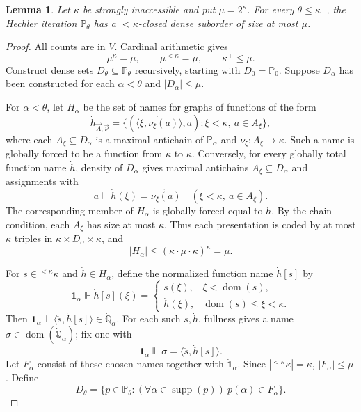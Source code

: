 \documentclass[11pt,a4paper]{amsart}
\newtheorem{lemma}[theorem]{Lemma}
\theoremstyle{definition}
\theoremstyle{remark}
\newcommand{\PP}{\mathbb P}
\DeclareMathOperator{\dom}{dom}
\DeclareMathOperator{\supp}{supp}
\begin{document}
\begin{lemma}\label{lem:iteration-size}
Let \(\kappa\) be strongly inaccessible and put \(\mu=2^\kappa\).
For every \(\theta\leq\kappa^+\), the Hechler iteration
\(\PP_\theta\) has a \(<\kappa\)-closed dense suborder of
size at most \(\mu\).
\end{lemma}
\begin{proof}
All counts are in \(V\). Cardinal arithmetic gives
\[
 \mu^\kappa=\mu,\qquad \mu^{<\kappa}=\mu,
 \qquad\kappa^+\leq\mu.
\]
Construct dense sets \(D_\theta\subseteq\PP_\theta\)
recursively, starting with \(D_0=\PP_0\). Suppose
\(D_\alpha\) has been constructed for each \(\alpha<\theta\)
and \(|D_\alpha|\leq\mu\).

For \(\alpha<\theta\), let \(H_\alpha\) be the set of
names for graphs of functions of the form
\[
 \dot h_{\vec A,\vec\nu}=
 \{(\check{\langle\xi,\nu_\xi(a)\rangle},a):
                       \xi<\kappa,\ a\in A_\xi\},
\]
where each \(A_\xi\subseteq D_\alpha\) is a maximal
antichain of \(\PP_\alpha\) and
\(\nu_\xi:A_\xi\to\kappa\). Such a name is globally
forced to be a function from \(\kappa\) to \(\kappa\).
Conversely, for every globally total function name
\(\dot h\), density of \(D_\alpha\) gives maximal
antichains \(A_\xi\subseteq D_\alpha\) and assignments with
\[
 a\Vdash\dot h(\xi)=\check{\nu_\xi(a)}
                            \quad(\xi<\kappa,\ a\in A_\xi).
\]
The corresponding member of \(H_\alpha\) is globally
forced equal to \(\dot h\). By the chain condition,
each \(A_\xi\) has size at most \(\kappa\). Thus each
presentation is coded by at most \(\kappa\) triples in
\(\kappa\times D_\alpha\times\kappa\), and
\[
 |H_\alpha|\leq
            (\kappa\cdot\mu\cdot\kappa)^\kappa=\mu.
\]

For \(s\in{}^{<\kappa}\kappa\) and \(\dot h\in H_\alpha\),
define the normalized function name \(\dot h[s]\) by
\[
 \mathbf1_\alpha\Vdash\dot h[s](\xi)=
 \begin{cases}
  s(\xi),&\xi<\dom(s),\\
  \dot h(\xi),&\dom(s)\leq\xi<\kappa.
 \end{cases}
\]
Then \(\mathbf1_\alpha\Vdash
\langle\check s,\dot h[s]\rangle
                                      \in\dot{\mathbb Q}_\alpha\).
For each such \(s,\dot h\), fullness gives a name
\(\sigma\in\dom(\dot{\mathbb Q}_\alpha)\); fix one with
\[
 \mathbf1_\alpha\Vdash
                 \sigma=\langle\check s,\dot h[s]\rangle.
\]
Let \(F_\alpha\) consist of these chosen names together
with \(\dot{\mathbf1}_\alpha\).
Since \(|{}^{<\kappa}\kappa|=\kappa\),
\(|F_\alpha|\leq\mu\). Define
\[
 D_\theta=\{p\in\PP_\theta:
       (\forall\alpha\in\supp(p))\ p(\alpha)\in F_\alpha\}.
\]


\end{proof}
\end{document}
